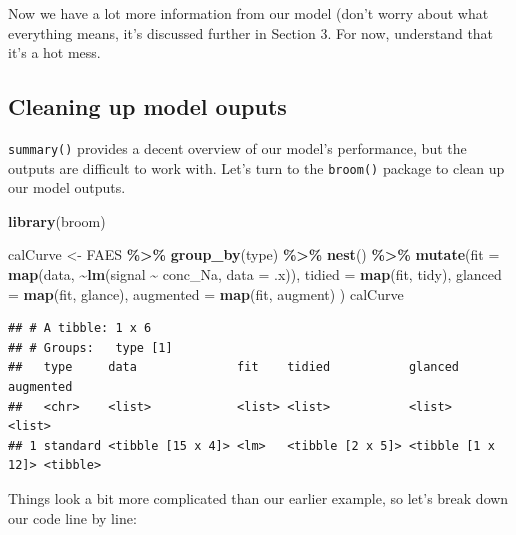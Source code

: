 \documentclass[
]{book}
\newenvironment{Shaded}{\begin{snugshade}}{\end{snugshade}}
\newcommand{\AttributeTok}[1]{\textcolor[rgb]{0.13,0.29,0.53}{#1}}
\newcommand{\FunctionTok}[1]{\textcolor[rgb]{0.13,0.29,0.53}{\textbf{#1}}}
\newcommand{\NormalTok}[1]{#1}
\newcommand{\OtherTok}[1]{\textcolor[rgb]{0.56,0.35,0.01}{#1}}
\newcommand{\SpecialCharTok}[1]{\textcolor[rgb]{0.81,0.36,0.00}{\textbf{#1}}}
\begin{document}
Now we have a lot more information from our model (don't worry about what everything means, it's discussed further in Section 3. For now, understand that it's a hot mess.

\hypertarget{cleaning-up-model-ouputs}{%
\subsection{Cleaning up model ouputs}\label{cleaning-up-model-ouputs}}

\texttt{summary()} provides a decent overview of our model's performance, but the outputs are difficult to work with. Let's turn to the \texttt{broom()} package to clean up our model outputs.

\begin{Shaded}
\begin{Highlighting}[]
\FunctionTok{library}\NormalTok{(broom)}

\NormalTok{calCurve }\OtherTok{\textless{}{-}}\NormalTok{ FAES }\SpecialCharTok{\%\textgreater{}\%}
  \FunctionTok{group\_by}\NormalTok{(type) }\SpecialCharTok{\%\textgreater{}\%}
  \FunctionTok{nest}\NormalTok{() }\SpecialCharTok{\%\textgreater{}\%}
  \FunctionTok{mutate}\NormalTok{(}\AttributeTok{fit =} \FunctionTok{map}\NormalTok{(data, }\SpecialCharTok{\textasciitilde{}}\FunctionTok{lm}\NormalTok{(signal }\SpecialCharTok{\textasciitilde{}}\NormalTok{ conc\_Na, }\AttributeTok{data =}\NormalTok{ .x)),}
         \AttributeTok{tidied =} \FunctionTok{map}\NormalTok{(fit, tidy),}
         \AttributeTok{glanced =} \FunctionTok{map}\NormalTok{(fit, glance),}
         \AttributeTok{augmented =} \FunctionTok{map}\NormalTok{(fit, augment)}
\NormalTok{         )}
\NormalTok{calCurve}
\end{Highlighting}
\end{Shaded}

\begin{verbatim}
## # A tibble: 1 x 6
## # Groups:   type [1]
##   type     data              fit    tidied           glanced           augmented
##   <chr>    <list>            <list> <list>           <list>            <list>   
## 1 standard <tibble [15 x 4]> <lm>   <tibble [2 x 5]> <tibble [1 x 12]> <tibble>
\end{verbatim}

Things look a bit more complicated than our earlier example, so let's break down our code line by line:
\end{document}
